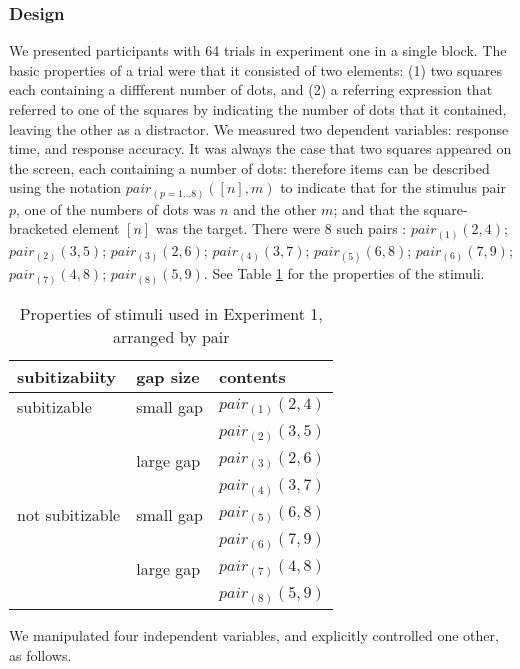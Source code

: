 \documentclass[doc,floatmark]{apa}
\begin{document}
\subsubsection{Design}
We presented participants with 64 trials in experiment one in a single block. The basic properties of a trial were that it consisted of two elements: (1) two squares each containing a diffferent number of dots, and (2) a referring expression that referred to one of the squares by indicating the number of dots that it contained, leaving the other as a distractor. We measured two dependent variables: response time, and response accuracy. It was always the case that two squares appeared on the screen, each containing a number of dots: therefore items can be described using the notation $pair_{(p=1... 8)}([n],m)$ to indicate that for the stimulus pair $p$, one of the numbers of dots was $n$ and the other $m$; and that the square-bracketed element $[n]$ was the target. There were 8 such pairs : $pair_{(1)}(2,4)$; $pair_{(2)}(3,5)$; $pair_{(3)}(2,6)$; $pair_{(4)}(3,7)$; $pair_{(5)}(6,8)$; $pair_{(6)}(7,9)$; $pair_{(7)}(4,8)$; $pair_{(8)}(5,9)$. See Table \ref{tablee1} for the properties of the stimuli.

\begin{table}[tbp]
\caption{Properties of stimuli used in Experiment 1, arranged by pair}
\label{tablee1}
\begin{tabular}{lll}
subitizabiity	& gap size  	&	contents\\
\hline
subitizable	&small gap	&	$pair_{(1)}(2,4)$\\
 			&			&	$pair_{(2)}(3,5)$\\
\hline
			&large gap	&	$pair_{(3)}(2,6)$\\
			&			&	$pair_{(4)}(3,7)$\\
\hline
not subitizable	&small gap	&	$pair_{(5)}(6,8)$\\
			&			&	$pair_{(6)}(7,9)$\\
\hline
			&large gap	&	$pair_{(7)}(4,8)$\\
			&			&	$pair_{(8)}(5,9)$\\
\hline
\end{tabular}
\end{table}

We manipulated four independent variables, and explicitly controlled one other, as follows. 
\end{document}
